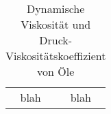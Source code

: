 \begin{table}[htb]
    \centering
    \caption{Dynamische Viskosität und Druck-Viskositätskoeffizient von Öle}
    \begin{tabular}{cc}
    blah & blah \\
    \end{tabular}
    \label{tab:dynamic_viscosity_and_pressure_exponents_of_some_lubricants}
\end{table}


